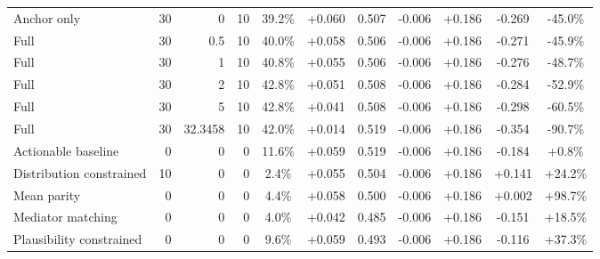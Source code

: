 \begin{table}[htbp]
\begin{tabular}{lrrrccccccc}
Anchor only & 30 & 0 & 10 & 39.2\% & +0.060 & 0.507 & -0.006 & +0.186 & -0.269 & -45.0\% \\
Full & 30 & 0.5 & 10 & 40.0\% & +0.058 & 0.506 & -0.006 & +0.186 & -0.271 & -45.9\% \\
Full & 30 & 1 & 10 & 40.8\% & +0.055 & 0.506 & -0.006 & +0.186 & -0.276 & -48.7\% \\
Full & 30 & 2 & 10 & 42.8\% & +0.051 & 0.508 & -0.006 & +0.186 & -0.284 & -52.9\% \\
Full & 30 & 5 & 10 & 42.8\% & +0.041 & 0.508 & -0.006 & +0.186 & -0.298 & -60.5\% \\
Full & 30 & 32.3458 & 10 & 42.0\% & +0.014 & 0.519 & -0.006 & +0.186 & -0.354 & -90.7\% \\
Actionable baseline & 0 & 0 & 0 & 11.6\% & +0.059 & 0.519 & -0.006 & +0.186 & -0.184 & +0.8\% \\
Distribution constrained & 10 & 0 & 0 & 2.4\% & +0.055 & 0.504 & -0.006 & +0.186 & +0.141 & +24.2\% \\
Mean parity & 0 & 0 & 0 & 4.4\% & +0.058 & 0.500 & -0.006 & +0.186 & +0.002 & +98.7\% \\
Mediator matching & 0 & 0 & 0 & 4.0\% & +0.042 & 0.485 & -0.006 & +0.186 & -0.151 & +18.5\% \\
Plausibility constrained & 0 & 0 & 0 & 9.6\% & +0.059 & 0.493 & -0.006 & +0.186 & -0.116 & +37.3\% \\
\bottomrule
\end{tabular}
\end{table}